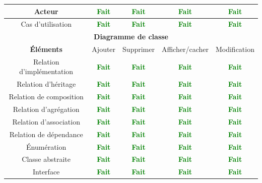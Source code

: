 \documentclass[hidelinks, a4paper,11pt,twoside,final]{article}
\begin{document}
\begin{tabular}{|c|c|c|c|c|}
    {Acteur} & {\textcolor{green}{\textbf{Fait}}} & {\textcolor{green}{\textbf{Fait}}} & {\textcolor{green}{\textbf{Fait}}} & {\textcolor{green}{\textbf{Fait}}}\\\hline
    {Cas d’utilisation} & {\textcolor{green}{\textbf{Fait}}} & {\textcolor{green}{\textbf{Fait}}} & {\textcolor{green}{\textbf{Fait}}} & {\textcolor{green}{\textbf{Fait}}}\\\hline
    \multicolumn{5}{|c|}{\textbf{Diagramme de classe}} \\\hline
    {\textbf{Éléments}} & {Ajouter} & {Supprimer} & {Afficher/cacher} & {Modification}\\\hline
    {Relation d’implémentation} & {\textcolor{green}{\textbf{Fait}}} & {\textcolor{green}{\textbf{Fait}}} & {\textcolor{green}{\textbf{Fait}}} & {\textcolor{green}{\textbf{Fait}}}\\\hline
    {Relation d’héritage} & {\textcolor{green}{\textbf{Fait}}} & {\textcolor{green}{\textbf{Fait}}} & {\textcolor{green}{\textbf{Fait}}} & {\textcolor{green}{\textbf{Fait}}}\\\hline
    {Relation de composition} & {\textcolor{green}{\textbf{Fait}}} & {\textcolor{green}{\textbf{Fait}}} & {\textcolor{green}{\textbf{Fait}}} & {\textcolor{green}{\textbf{Fait}}}\\\hline
    {Relation d’agrégation} & {\textcolor{green}{\textbf{Fait}}} & {\textcolor{green}{\textbf{Fait}}} & {\textcolor{green}{\textbf{Fait}}} & {\textcolor{green}{\textbf{Fait}}}\\\hline
    {Relation d’association} & {\textcolor{green}{\textbf{Fait}}} & {\textcolor{green}{\textbf{Fait}}} & {\textcolor{green}{\textbf{Fait}}} & {\textcolor{green}{\textbf{Fait}}}\\\hline
    {Relation de dépendance} & {\textcolor{green}{\textbf{Fait}}} & {\textcolor{green}{\textbf{Fait}}} & {\textcolor{green}{\textbf{Fait}}} & {\textcolor{green}{\textbf{Fait}}}\\\hline
    {Énumération} & {\textcolor{green}{\textbf{Fait}}} & {\textcolor{green}{\textbf{Fait}}} & {\textcolor{green}{\textbf{Fait}}} & {\textcolor{green}{\textbf{Fait}}}\\\hline
    {Classe abstraite} & {\textcolor{green}{\textbf{Fait}}} & {\textcolor{green}{\textbf{Fait}}} & {\textcolor{green}{\textbf{Fait}}} & {\textcolor{green}{\textbf{Fait}}}\\\hline
    {Interface} & {\textcolor{green}{\textbf{Fait}}} & {\textcolor{green}{\textbf{Fait}}} & {\textcolor{green}{\textbf{Fait}}} & {\textcolor{green}{\textbf{Fait}}}\\\hline

\end{tabular}
\end{document}
